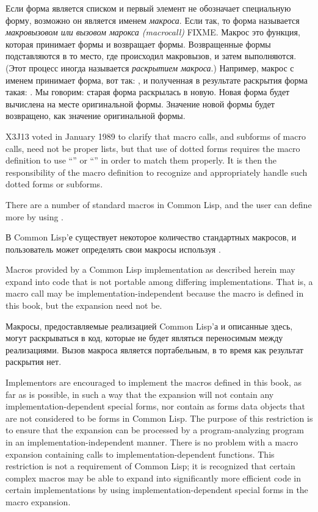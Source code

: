 Если форма является списком и первый элемент не обозначает специальную
форму, возможно он является именем \textit{макроса}. Если так, то форма
называется \textit{макровызовом или вызовом марокса (macrocall)} FIXME. Макрос
это функция, которая принимает формы и возвращает формы. Возвращенные формы
подставляются в то место, где происходил макровызов, и затем выполняются. (Этот
процесс иногда называется \textit{раскрытием макроса}.)
Например, макрос с именем  принимает форма, вот так: ,
и полученная в результате раскрытия форма такая: . Мы
говорим: старая форма раскрылась в новую. Новая форма будет вычислена на месте
оригинальной формы. Значение новой формы будет возвращено, как значение
оригинальной формы.

\begin{new}
X3J13 voted in January 1989
to clarify that macro calls, and subforms
of macro calls, need not be proper lists, but that use of dotted forms
requires the macro definition to use ``'' or
``'' in order to match them properly.
It is then the responsibility of the macro definition to recognize
and appropriately handle such dotted forms or subforms.
\end{new}

There are a number of standard macros in Common Lisp, and the user can define more
by using .

В Common Lisp'е существует некоторое количество стандартных макросов, и
пользователь может определять свои макросы используя .

Macros provided by a Common Lisp implementation as described herein may expand
into code that is not portable among differing implementations.
That is, a macro call may be implementation-independent because
the macro is defined in this book, but the expansion need not be.

Макросы, предоставляемые реализацией Common Lisp'а и описанные здесь, могут
раскрываться в код, которые не будет являться переносимым между реализациями.
Вызов макроса является портабельным, в то время как результат раскрытия нет.

\beforenoterule
\begin{implementation}
Implementors are encouraged to implement the macros
defined in this book, as far as is possible, in such a way that
the expansion will not contain any implementation-dependent
special forms, nor contain as forms data objects that
are not considered to be forms in Common Lisp.
The purpose of this restriction is to ensure that the expansion
can be processed by a program-analyzing program in an
implementation-independent manner.
There is no problem with a macro expansion containing
calls to implementation-dependent functions.
This restriction is not a requirement of Common Lisp; it is recognized
that certain complex macros may be able to expand into significantly
more efficient code in certain implementations
by using implementation-dependent special forms in the macro expansion.
\end{implementation}
\afternoterule

